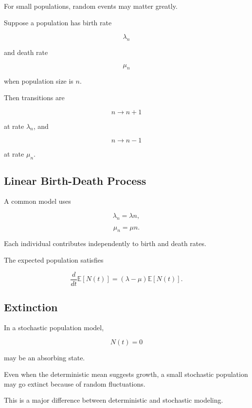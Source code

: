 For small populations, random events may matter greatly.

Suppose a population has birth rate

\[
\lambda_n
\]

and death rate

\[
\mu_n
\]

when population size is \(n\).

Then transitions are

\[
\boxed{
n
\rightarrow
n+1
}
\]

at rate \(\lambda_n\), and

\[
\boxed{
n
\rightarrow
n-1
}
\]

at rate \(\mu_n\).

\subsection{Linear Birth-Death Process}
\label{subsec:linear-birth-death}

A common model uses

\[
\boxed{
\lambda_n
=
\lambda n,
}
\]

\[
\boxed{
\mu_n
=
\mu n.
}
\]

Each individual contributes independently to birth and death rates.

The expected population satisfies

\[
\boxed{
\frac{d}{dt}\mathbb{E}[N(t)]
=
(\lambda-\mu)
\mathbb{E}[N(t)].
}
\]

\subsection{Extinction}
\label{subsec:biological-extinction}

In a stochastic population model,

\[
\boxed{
N(t)=0
}
\]

may be an absorbing state.

Even when the deterministic mean suggests growth, a small stochastic
population may go extinct because of random fluctuations.

This is a major difference between deterministic and stochastic modeling.

